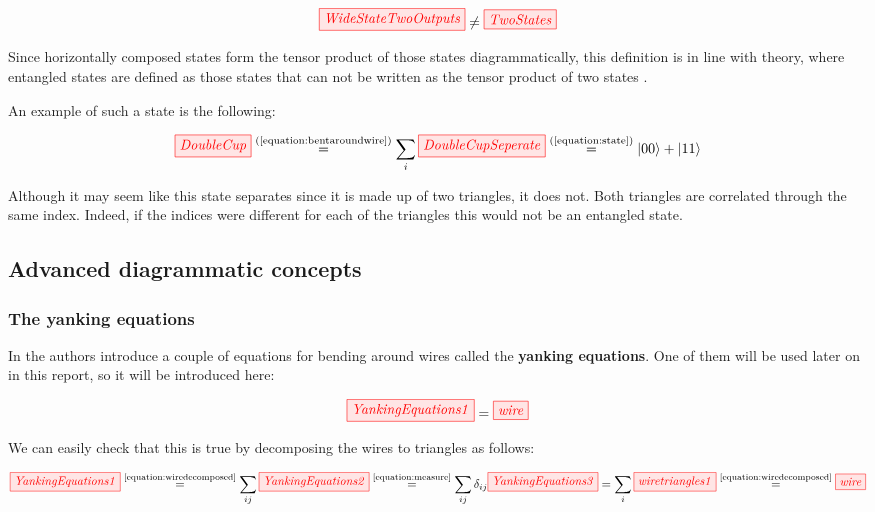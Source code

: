 \documentclass[]{article}
\newcommand{\equaltext}[1]{\ensuremath{\stackrel{\text{#1}}{=}}}
\begin{document}
\begin{equation}
\tikzfig{WideStateTwoOutputs} \neq \tikzfig{TwoStates}
\end{equation}

Since horizontally composed states form the tensor product of those states diagrammatically, this definition is in line with theory, where entangled states are defined as those states that can not be written as the tensor product of two states \cite{Nielsen2011}. 

An example of such a state is the following:

\begin{equation}
\tikzfig{DoubleCup} \equaltext{(\ref{equation:bentaroundwire})} \sum\limits_{i} \tikzfig{DoubleCupSeperate} \equaltext{(\ref{equation:state})} \ket{00} + \ket{11}
\end{equation}

Although it may seem like this state separates since it is made up of two triangles, it does not. Both triangles are correlated through the same index. Indeed, if the indices were different for each of the triangles this would not be an entangled state.

\subsection{Advanced diagrammatic concepts}

\subsubsection{The yanking equations}
\label{section:yankingequations}

In \cite{Coecke2017} the authors introduce a couple of equations for bending around wires called the \textbf{yanking equations}. One of them will be used later on in this report, so it will be introduced here:

\begin{equation}
	\label{equation:yankingequation}
	\tikzfig{YankingEquations1} = \tikzfig{wire}
\end{equation}

We can easily check that this is true by decomposing the wires to triangles as follows:

\begin{equation}
	\tikzfig{YankingEquations1} \equaltext{\ref{equation:wiredecomposed}} \sum\limits_{ij} \tikzfig{YankingEquations2} \equaltext{\ref{equation:measure}} \sum\limits_{ij} \delta_{ij} \tikzfig{YankingEquations3} = \sum\limits_{i} \tikzfig{wiretriangles1} \equaltext{\ref{equation:wiredecomposed}} \tikzfig{wire}
\end{equation}
\end{document}
